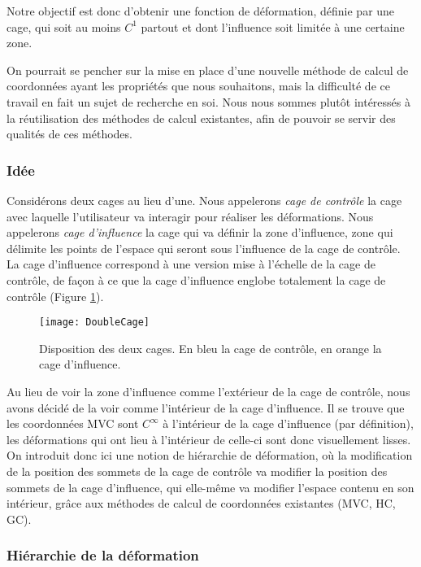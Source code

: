 Notre objectif est donc d'obtenir une fonction de déformation, définie par une
cage, qui soit au moins $C^1$ partout et dont l'influence soit limitée à une
certaine zone.

On pourrait se pencher sur la mise en place d'une nouvelle méthode de calcul
de coordonnées ayant les propriétés que nous souhaitons, mais la difficulté de
ce travail en fait un sujet de recherche en soi. Nous nous sommes plutôt
intéressés à la réutilisation des méthodes de calcul existantes, afin de
pouvoir se servir des qualités de ces méthodes.

\subsubsection{Idée}

Considérons deux cages au lieu d'une. Nous appelerons \textit{cage de
contrôle} la cage avec laquelle l'utilisateur va interagir pour réaliser les
déformations. Nous appelerons \textit{cage d'influence} la cage qui va définir
la zone d'influence, zone qui délimite les points de l'espace qui seront sous
l'influence de la cage de contrôle. La cage d'influence correspond à une
version mise à l'échelle de la cage de contrôle, de façon à ce que la cage
d'influence englobe totalement la cage de contrôle (Figure \ref{MELDou}).

\begin{figure}[ht]
  \begin{center}
    \texttt{[image: DoubleCage]}
    \caption{Disposition des deux cages. En bleu la cage de contrôle, en orange
    la cage d'influence.}
    \label{MELDou}
  \end{center}
\end{figure}

Au lieu de voir la zone d'influence comme l'extérieur de la cage de contrôle,
nous avons décidé de la voir comme l'intérieur de la cage d'influence. Il se
trouve que les coordonnées MVC sont $C^{\infty}$ à l'intérieur de la cage
d'influence (par définition), les déformations qui ont lieu à l'intérieur de
celle-ci sont donc visuellement lisses. On introduit donc ici une notion de
hiérarchie de déformation, où la modification de la position des sommets de la
cage de contrôle va modifier la position des sommets de la cage d'influence,
qui elle-même va modifier l'espace contenu en son intérieur, grâce aux
méthodes de calcul de coordonnées existantes (MVC, HC, GC). \\

\subsubsection{Hiérarchie de la déformation}

